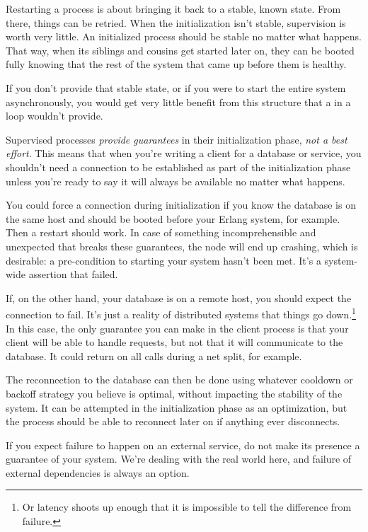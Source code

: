 Restarting a process is about bringing it back to a stable, known state. From there, things can be retried. When the initialization isn't stable, supervision is worth very little. An initialized process should be stable no matter what happens. That way, when its siblings and cousins get started later on, they can be booted fully knowing that the rest of the system that came up before them is healthy.

If you don't provide that stable state, or if you were to start the entire system asynchronously, you would get very little benefit from this structure that a  in a loop wouldn't provide.

Supervised processes \emph{provide guarantees} in their initialization phase, \emph{not a best effort}. This means that when you're writing a client for a database or service, you shouldn't need a connection to be established as part of the initialization phase unless you're ready to say it will always be available no matter what happens.

You could force a connection during initialization if you know the database is on the same host and should be booted before your Erlang system, for example. Then a restart should work. In case of something incomprehensible and unexpected that breaks these guarantees, the node will end up crashing, which is desirable: a pre-condition to starting your system hasn't been met. It's a system-wide assertion that failed.

If, on the other hand, your database is on a remote host, you should expect the connection to fail. It's just a reality of distributed systems that things go down.\footnote{Or latency shoots up enough that it is impossible to tell the difference from failure.} In this case, the only guarantee you can make in the client process is that your client will be able to handle requests, but not that it will communicate to the database. It could return  on all calls during a net split, for example.

The reconnection to the database can then be done using whatever cooldown or backoff strategy you believe is optimal, without impacting the stability of the system. It can be attempted in the initialization phase as an optimization, but the process should be able to reconnect later on if anything ever disconnects.

If you expect failure to happen on an external service, do not make its presence a guarantee of your system. We're dealing with the real world here, and failure of external dependencies is always an option. 

